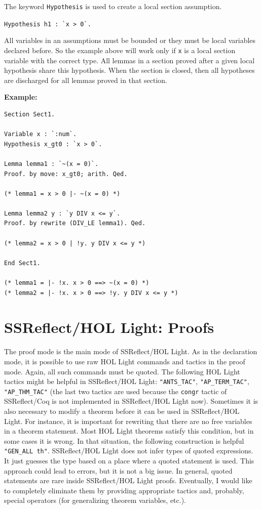 \documentclass[a4paper]{article}
\begin{document}
The keyword \verb|Hypothesis| is used to create a local section assumption.

\verb|Hypothesis h1 : `x > 0`.|

All variables in an assumptions must be bounded or they must be local variables declared before. So the example above will work only if \verb|x| is a local section variable with the correct type. All lemmas in a section proved after a given local hypothesis share this hypothesis. When the section is closed, then all hypotheses are discharged for all lemmas proved in that section. 

{\bf Example:}
\begin{verbatim}
Section Sect1.

Variable x : `:num`.
Hypothesis x_gt0 : `x > 0`.

Lemma lemma1 : `~(x = 0)`.
Proof. by move: x_gt0; arith. Qed.

(* lemma1 = x > 0 |- ~(x = 0) *)

Lemma lemma2 y : `y DIV x <= y`.
Proof. by rewrite (DIV_LE lemma1). Qed.

(* lemma2 = x > 0 | !y. y DIV x <= y *)

End Sect1.

(* lemma1 = |- !x. x > 0 ==> ~(x = 0) *)
(* lemma2 = |- !x. x > 0 ==> !y. y DIV x <= y *)
\end{verbatim}


\section{SSReflect/HOL Light: Proofs}
The proof mode is the main mode of SSReflect/HOL Light. As in the declaration mode, it is possible to use raw HOL Light commands and tactics in the proof mode. Again, all such commands must be quoted. The following HOL Light tactics might be helpful in SSReflect/HOL Light: \verb|"ANTS_TAC"|, \verb|"AP_TERM_TAC"|, \verb|"AP_THM_TAC"| (the last two tactics are used because the \verb|congr| tactic of SSReflect/Coq is not implemented in SSReflect/HOL Light now). Sometimes it is also necessary to modify a theorem before it can be used in SSReflect/HOL Light. For instance, it is important for rewriting that there are no free variables in a theorem statement. Most HOL Light theorems satisfy this condition, but in some cases it is wrong. In that situation, the following construction is helpful \verb|"GEN_ALL th"|. SSReflect/HOL Light does not infer types of quoted expressions. It just guesses the type based on a place where a quoted statement is used. This approach could lead to errors, but it is not a big issue. In general, quoted statements are rare inside SSReflect/HOL Light proofs. Eventually, I would like to completely eliminate them by providing appropriate tactics and, probably, special operators (for generalizing theorem variables, etc.).
\end{document}
